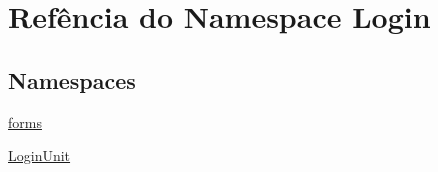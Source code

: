 \hypertarget{namespaceLogin}{\section{Refência do Namespace Login}
\label{namespaceLogin}
}
\subsection*{Namespaces}
\begin{DoxyCompactItemize}
\item 
\hyperlink{namespaceLogin_1_1forms}{forms}
\item 
\hyperlink{namespaceLogin_1_1LoginUnit}{Login\-Unit}
\end{DoxyCompactItemize}
